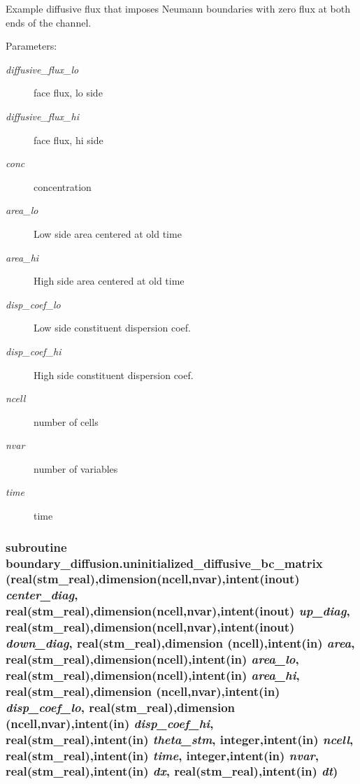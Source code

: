 Example diffusive flux that imposes Neumann boundaries with zero flux at both ends of the channel. 

\begin{Desc}
\item[Parameters:]
\begin{description}
\item[{\em diffusive\_\-flux\_\-lo}]face flux, lo side\item[{\em diffusive\_\-flux\_\-hi}]face flux, hi side\item[{\em conc}]concentration \item[{\em area\_\-lo}]Low side area centered at old time\item[{\em area\_\-hi}]High side area centered at old time\item[{\em disp\_\-coef\_\-lo}]Low side constituent dispersion coef.\item[{\em disp\_\-coef\_\-hi}]High side constituent dispersion coef.\item[{\em ncell}]number of cells\item[{\em nvar}]number of variables\item[{\em time}]time \end{description}
\end{Desc}
\hypertarget{a00051_6a67899a1c3944d943a1b2fb5aac2986}{
\subsubsection[{uninitialized\_\-diffusive\_\-bc\_\-matrix}]{\setlength{\rightskip}{0pt plus 5cm}subroutine boundary\_\-diffusion.uninitialized\_\-diffusive\_\-bc\_\-matrix (real(stm\_\-real),dimension(ncell,nvar),intent(inout) {\em center\_\-diag}, \/  real(stm\_\-real),dimension(ncell,nvar),intent(inout) {\em up\_\-diag}, \/  real(stm\_\-real),dimension(ncell,nvar),intent(inout) {\em down\_\-diag}, \/  real(stm\_\-real),dimension (ncell),intent(in) {\em area}, \/  real(stm\_\-real),dimension(ncell),intent(in) {\em area\_\-lo}, \/  real(stm\_\-real),dimension(ncell),intent(in) {\em area\_\-hi}, \/  real(stm\_\-real),dimension (ncell,nvar),intent(in) {\em disp\_\-coef\_\-lo}, \/  real(stm\_\-real),dimension (ncell,nvar),intent(in) {\em disp\_\-coef\_\-hi}, \/  real(stm\_\-real),intent(in) {\em theta\_\-stm}, \/  integer,intent(in) {\em ncell}, \/  real(stm\_\-real),intent(in) {\em time}, \/  integer,intent(in) {\em nvar}, \/  real(stm\_\-real),intent(in) {\em dx}, \/  real(stm\_\-real),intent(in) {\em dt})}}
\label{a00051_6a67899a1c3944d943a1b2fb5aac2986}


